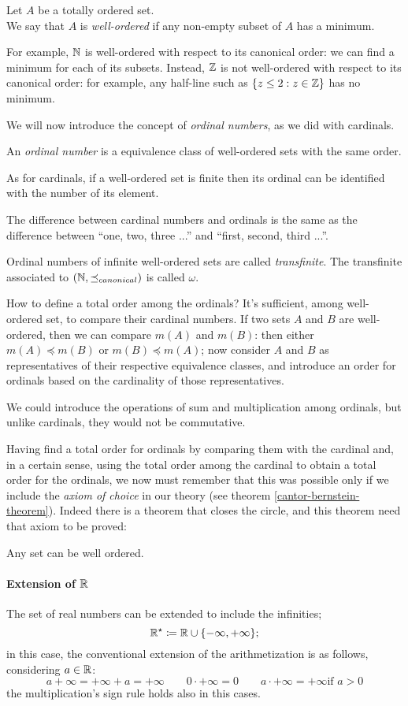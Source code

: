\begin{defn}
	Let $A$ be a totally ordered set. \\
	We say that $A$ is \emph{well-ordered} if any non-empty subset of $A$ has a minimum.
\end{defn}

For example, $\mathbb N$ is well-ordered with respect to its canonical order: we can find a minimum for each of its subsets. Instead, $\mathbb Z$ is not well-ordered with respect to its canonical order: for example, any half-line such as $\{ z \le 2 : z \in \mathbb Z \}$ has no minimum.

We will now introduce the concept of \textit{ordinal numbers}, as we did with cardinals.

\begin{defn}
	An \emph{ordinal number} is a equivalence class of well-ordered sets with the same order.
\end{defn}

As for cardinals, if a well-ordered set is finite then its ordinal can be identified with the number of its element.

The difference between cardinal numbers and ordinals is the same as the difference between ``one, two, three ...'' and ``first, second, third ...''.

Ordinal numbers of infinite well-ordered sets are called \textit{transfinite}. The transfinite associated to $(\mathbb N, \preceq_{canonical})$ is called $\omega$.

How to define a total order among the ordinals? It's sufficient, among well-ordered set, to compare their cardinal numbers. If two sets $A$ and $B$ are well-ordered, then we can compare $m(A)$ and $m(B)$: then either $m(A) \preceq m(B)$ or $m(B) \preceq m(A)$; now consider $A$ and $B$ as representatives of their respective equivalence classes, and introduce an order for ordinals based on the cardinality of those representatives.

We could introduce the operations of sum and multiplication among ordinals, but unlike cardinals, they would not be commutative.

Having find a total order for ordinals by comparing them with the cardinal and, in a certain sense, using the total order among the cardinal to obtain a total order for the ordinals, we now must remember that this was possible only if we include the \textit{axiom of choice} in our theory (see theorem \vref{cantor-bernstein-theorem}). Indeed there is a theorem that closes the circle, and this theorem need that axiom to be proved:
\begin{theo} [Zermelo]
	Any set can be well ordered.
\end{theo} 

\paragraph{Extension of $\mathbb R$} The set of real numbers can be extended to include the infinities;
$$
	\mathbb R^\star 
	\coloneqq \mathbb R \cup \{-\infty, +\infty\}
;
$$
in this case, the conventional extension of the arithmetization is as follows, considering $a \in \mathbb R$:
$$ 
	a+\infty = +\infty+a = +\infty
	\qquad 0 \cdot +\infty = 0
	\qquad a \cdot +\infty = +\infty \text{if } a>0
$$ 
the multiplication's sign rule holds also in this cases.

